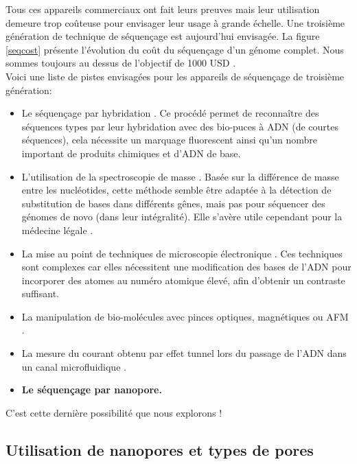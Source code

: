 Tous ces appareils commerciaux  ont fait leurs preuves mais leur utilisation demeure trop coûteuse pour envisager leur usage à grande échelle. Une troisième génération de technique de séquençage est aujourd'hui envisagée. La figure \ref{seqcost} présente l'évolution du coût du séquençage d'un génome complet. Nous sommes toujours au dessus de l'objectif de 1000 USD \cite{Mardis2006}.
\\

Voici une liste de pistes envisagées pour les appareils de séquençage de troisième génération:

\begin{itemize}


\item Le séquençage par hybridation \cite{Zhang2003}. Ce procédé permet de reconnaître des séquences types par leur hybridation avec des bio-puces à ADN (de courtes séquences), cela nécessite un marquage fluorescent ainsi qu'un nombre important de produits chimiques et d'ADN de base.

\item L'utilisation de la spectroscopie de masse \cite{Edwards2005}. Basée sur la différence de masse entre les nucléotides, cette méthode semble être adaptée à la détection de substitution de bases dans différents gênes, mais pas pour séquencer des génomes de novo (dans leur intégralité). Elle s'avère utile cependant pour la médecine légale \cite{Howard2013}. 

\item La mise au point de techniques de microscopie électronique \cite{Bell2012}. Ces techniques sont complexes car elles nécessitent une modification des bases de l'ADN pour incorporer des atomes au numéro atomique élevé, afin d'obtenir un contraste suffisant.

\item La manipulation de bio-molécules avec pinces optiques, magnétiques ou AFM \cite{Pareek2011,Ding2012}.

\item La mesure du courant obtenu par effet tunnel lors du passage de l'ADN dans un canal microfluidique \cite{Ohshiro2012,DiVentra2013}.

\item \textbf{Le séquençage par nanopore.}


\end{itemize}


C'est cette dernière possibilité que nous explorons !

\subsection{Utilisation de nanopores et types de pores}

